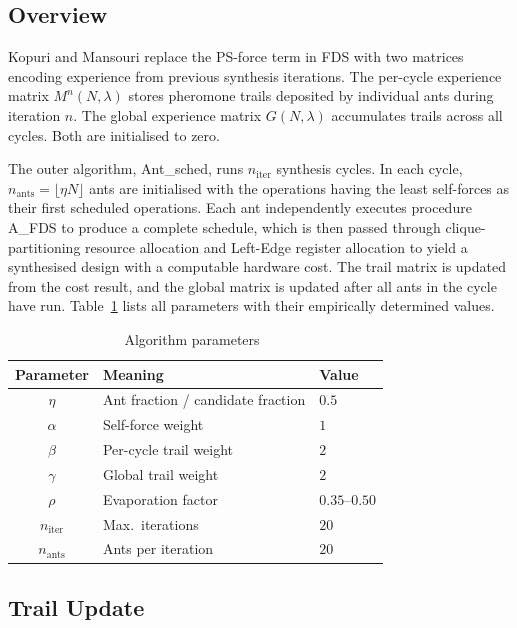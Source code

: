 \documentclass[conference]{IEEEtran}
\begin{document}
\subsection{Overview}

Kopuri and Mansouri replace the PS-force term in FDS with two matrices
encoding experience from previous synthesis iterations. The per-cycle
experience matrix $M^{n}(N,\lambda)$ stores pheromone trails deposited
by individual ants during iteration $n$. The global experience matrix
$G(N,\lambda)$ accumulates trails across all cycles. Both are initialised
to zero.

The outer algorithm, Ant\_sched, runs $n_{\text{iter}}$ synthesis cycles.
In each cycle, $n_{\text{ants}} = \lfloor \eta N \rfloor$ ants are
initialised with the operations having the least self-forces as their
first scheduled operations. Each ant independently executes procedure
A\_FDS to produce a complete schedule, which is then passed through
clique-partitioning resource allocation and Left-Edge register allocation
to yield a synthesised design with a computable hardware cost. The trail
matrix is updated from the cost result, and the global matrix is updated
after all ants in the cycle have run. Table~\ref{tab:params} lists all
parameters with their empirically determined values.

\begin{table}[h]
  \centering
  \caption{Algorithm parameters~\cite{kopuri2004aco}}
  \label{tab:params}
  \begin{tabular}{cll}
    \toprule
    Parameter & Meaning & Value \\
    \midrule
    $\eta$ & Ant fraction / candidate fraction & $0.5$ \\
    $\alpha$ & Self-force weight & $1$ \\
    $\beta$ & Per-cycle trail weight & $2$ \\
    $\gamma$ & Global trail weight & $2$ \\
    $\rho$ & Evaporation factor & $0.35$--$0.50$ \\
    $n_{\text{iter}}$ & Max.\ iterations & $20$ \\
    $n_{\text{ants}}$ & Ants per iteration & $20$ \\
    \bottomrule
  \end{tabular}
\end{table}

\subsection{Trail Update}
\end{document}
